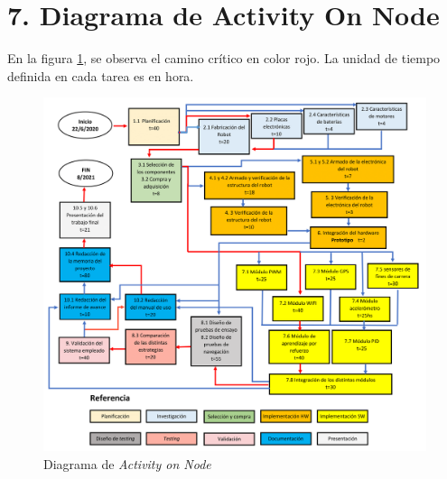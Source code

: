 \documentclass[11pt]{charter}
\begin{document}

\section{7. Diagrama de Activity On Node}
\label{sec:AoN}
En la figura \ref{fig:AoN}, se observa el camino crítico en color rojo. La unidad de tiempo definida en cada tarea es en hora.
 
\begin{figure}[htpb]
\centering 
\includegraphics[width=\textwidth]{./Figuras/AoN.png}
\caption{Diagrama de \textit{Activity on Node}}
\label{fig:AoN}
\end{figure}

\end{document}
